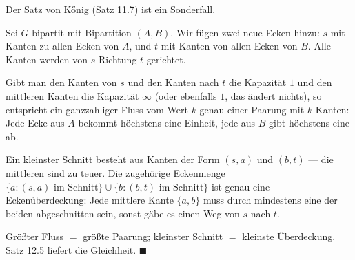 \begin{merksatz}
Der Satz von Kőnig (Satz 11.7) ist ein Sonderfall.

Sei $G$ bipartit mit Bipartition $(A,B)$. Wir fügen zwei neue Ecken hinzu: $s$ mit Kanten zu allen Ecken von $A$, und $t$ mit Kanten von allen Ecken von $B$. Alle Kanten werden von $s$ Richtung $t$ gerichtet.

\begin{center}
\end{center}

Gibt man den Kanten von $s$ und den Kanten nach $t$ die Kapazität $1$ und den mittleren Kanten die Kapazität $\infty$ (oder ebenfalls $1$, das ändert nichts), so entspricht ein ganzzahliger Fluss vom Wert $k$ genau einer Paarung mit $k$ Kanten: Jede Ecke aus $A$ bekommt höchstens eine Einheit, jede aus $B$ gibt höchstens eine ab.

Ein kleinster Schnitt besteht aus Kanten der Form $(s,a)$ und $(b,t)$ --- die mittleren sind zu teuer. Die zugehörige Eckenmenge $\{a : (s,a) \text{ im Schnitt}\} \cup \{b : (b,t) \text{ im Schnitt}\}$ ist genau eine Eckenüberdeckung: Jede mittlere Kante $\{a,b\}$ muss durch mindestens eine der beiden abgeschnitten sein, sonst gäbe es einen Weg von $s$ nach $t$.

Größter Fluss $=$ größte Paarung; kleinster Schnitt $=$ kleinste Überdeckung. Satz 12.5 liefert die Gleichheit. $\blacksquare$
\end{merksatz}


